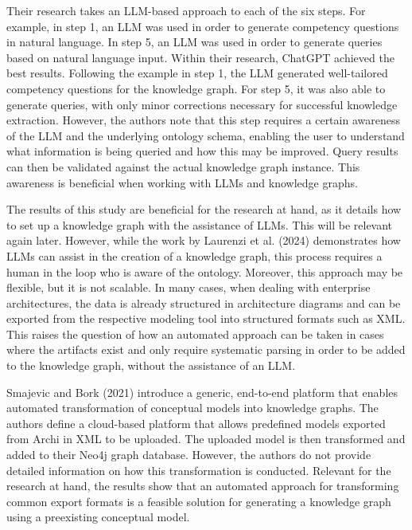 Their research takes an LLM-based approach to each of the six steps. For example, in step 1, an LLM was used in order to generate competency questions in natural language. In step 5, an LLM was used in order to generate queries based on natural language input. Within their research, ChatGPT achieved the best results. Following the example in step 1, the LLM generated well-tailored competency questions for the knowledge graph. For step 5, it was also able to generate queries, with only minor corrections necessary for successful knowledge extraction. However, the authors note that this step requires a certain awareness of the LLM and the underlying ontology schema, enabling the user to understand what information is being queried and how this may be improved. Query results can then be validated against the actual knowledge graph instance. This awareness is beneficial when working with LLMs and knowledge graphs.




The results of this study are beneficial for the research at hand, as it details how to set up a knowledge graph with the assistance of LLMs. This will be relevant again later. However, while the work by Laurenzi et al. (2024) \cite{laurenzi2024llm} demonstrates how LLMs can assist in the creation of a knowledge graph, this process requires a human in the loop who is aware of the ontology. Moreover, this approach may be flexible, but it is not scalable. In many cases, when dealing with enterprise architectures, the data is already structured in architecture diagrams and can be exported from the respective modeling tool into structured formats such as XML. This raises the question of how an automated approach can be taken in cases where the artifacts exist and only require systematic parsing in order to be added to the knowledge graph, without the assistance of an LLM.



Smajevic and Bork (2021) \cite{smajevic2021conceptual} introduce a generic, end-to-end platform that enables automated transformation of conceptual models into knowledge graphs. The authors define a cloud-based platform that allows predefined models exported from Archi in XML to be uploaded. The uploaded model is then transformed and added to their Neo4j graph database. However, the authors do not provide detailed information on how this transformation is conducted. Relevant for the research at hand, the results show that an automated approach for transforming common export formats is a feasible solution for generating a knowledge graph using a preexisting conceptual model.


